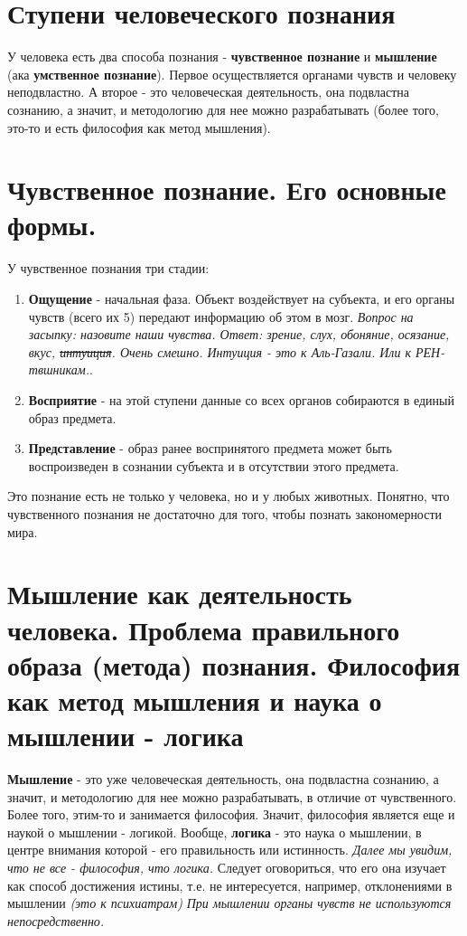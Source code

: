 \documentclass[12pt,a4paper]{article}
\begin{document}
\section{Ступени человеческого познания}
У человека есть два способа познания - \textbf{чувственное познание} и \textbf{мышление} (ака \textbf{умственное познание}).
Первое осуществляется органами чувств и человеку неподвластно.
А второе - это человеческая деятельность, она подвластна сознанию, а значит, и методологию для нее можно разрабатывать (более того, это-то и есть философия как метод мышления).

\section{Чувственное познание. Его основные формы.}
У чувственное познания три стадии:
\begin{enumerate}
\item \textbf{Ощущение} - начальная фаза. Объект воздействует на субъекта, и его органы чувств (всего их 5) передают информацию об этом в мозг. \textit{Вопрос на засыпку: назовите наши чувства. Ответ: зрение, слух, обоняние, осязание, вкус, \sout{интуиция}. Очень смешно. Интуиция - это к Аль-Газали. Или к РЕН-твшникам.}.
\item \textbf{Восприятие} - на этой ступени данные со всех органов собираются в единый образ предмета.
\item \textbf{Представление} - образ ранее воспринятого предмета может быть воспроизведен в сознании субъекта и в отсутствии этого предмета.
\end{enumerate}
Это познание есть не только у человека, но и у любых животных. Понятно, что чувственного познания не достаточно для того, чтобы познать закономерности мира.

\section{Мышление как деятельность человека. Проблема правильного образа (метода) познания. Философия как метод мышления и наука о мышлении - логика}
\textbf{Мышление} - это уже человеческая деятельность, она подвластна сознанию, а значит, и методологию для нее можно разрабатывать, в отличие от чувственного.
Более того, этим-то и занимается философия.
Значит, философия является еще и наукой о мышлении - логикой. Вообще, \textbf{логика} - это наука
о мышлении, в центре внимания которой - его правильность или истинность.\textit{ Далее мы увидим, что не все - философия, что логика.
} Следует оговориться, что его она изучает как способ достижения истины, т.е. не интересуется, например, отклонениями в мышлении \textit{(это к психиатрам)} \textit{ При мышлении органы чувств не используются непосредственно. }
\end{document}
